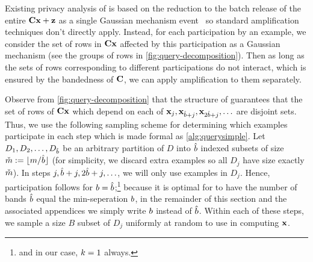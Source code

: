 \documentclass{article}
\begin{document}
Existing privacy analysis of \mfftrl is based on the reduction to the batch release of the entire $\mathbf{C} \mathbf{x} + \mathbf{z}$ as a single Gaussian mechanism event~\citep{denisov22matfact,choquette2022multi} %
so standard amplification techniques don't directly apply. Instead, for each participation by an example, we consider the set of rows in $\mathbf{C} \mathbf{x}$ affected by this participation as a Gaussian mechanism (see the groups of rows in \cref{fig:query-decomposition}). Then as long as the sets of rows corresponding to different participations do not interact, which is ensured by the bandedness of $\mathbf{C}$, we can apply amplification to them separately. 

Observe from \cref{fig:query-decomposition} that the structure of \BANDMF guarantees that the set of rows of $\mathbf{C} \mathbf{x}$ which depend on each of $\mathbf{x}_j, \mathbf{x}_{\hat{b} + j}, \mathbf{x}_{2 \hat{b} + j}, \ldots$ are disjoint sets.
Thus, we use the following sampling scheme for determining which examples participate in each step which is made formal as \cref{alg:querysimple}. Let $D_1, D_2, \ldots, D_{\hat{b}}$ be an arbitrary partition of $D$ into $\hat{b}$ indexed subsets of size $\check{m} := \lfloor m / \hat{b}\rfloor$ (for simplicity, we discard extra examples so all $D_j$ have size exactly $\check{m}$). In steps $j, \hat{b} + j, 2 \hat{b} + j, \ldots$, we will only use examples in $D_j$. Hence, participation follows \multiepochpart for $b = \hat{b}$;\footnote{and in our case, $k=1$ always.} because it is optimal for \multiepochpart to have the number of bands $\hat{b}$ equal the min-seperation $b$, in the remainder of this section and the associated appendices we simply write $b$ instead of $\hat{b}$. Within each of these steps, we sample a size $B$ subset of $D_j$ uniformly at random to use in computing $\mathbf{x}$. 
\end{document}
